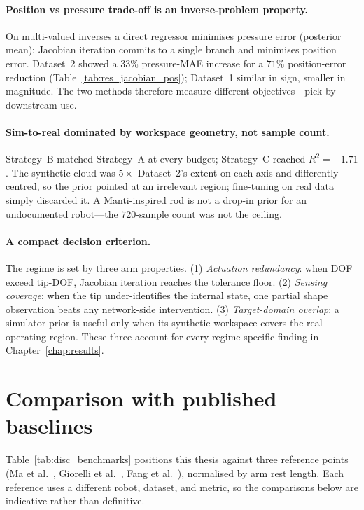 \paragraph{Position vs pressure trade-off is an inverse-problem property.}
On multi-valued inverses a direct regressor minimises pressure error (posterior mean); Jacobian iteration commits to a single branch and minimises position error. Dataset~2 showed a $33\%$ pressure-MAE increase for a $71\%$ position-error reduction (Table~\ref{tab:res_jacobian_pos}); Dataset~1 similar in sign, smaller in magnitude. The two methods therefore measure different objectives---pick by downstream use.

\paragraph{Sim-to-real dominated by workspace geometry, not sample count.}
Strategy~B matched Strategy~A at every budget; Strategy~C reached $R^{2} = -1.71$. The synthetic cloud was $5\times$ Dataset~2's extent on each axis and differently centred, so the prior pointed at an irrelevant region; fine-tuning on real data simply discarded it. A Manti-inspired rod is not a drop-in prior for an undocumented robot---the $720$-sample count was not the ceiling.

\paragraph{A compact decision criterion.}
The regime is set by three arm properties. (1) \emph{Actuation redundancy}: when DOF exceed tip-DOF, Jacobian iteration reaches the tolerance floor. (2) \emph{Sensing coverage}: when the tip under-identifies the internal state, one partial shape observation beats any network-side intervention. (3) \emph{Target-domain overlap}: a simulator prior is useful only when its synthetic workspace covers the real operating region. These three account for every regime-specific finding in Chapter~\ref{chap:results}.

\section{Comparison with published baselines}
\label{sec:disc_benchmarks}

Table~\ref{tab:disc_benchmarks} positions this thesis against three reference points (Ma et al.\ \cite{ma2022bp}, Giorelli et al.\ \cite{giorelli2015nn}, Fang et al.\ \cite{fang2022jacobian}), normalised by arm rest length. Each reference uses a different robot, dataset, and metric, so the comparisons below are indicative rather than definitive.

